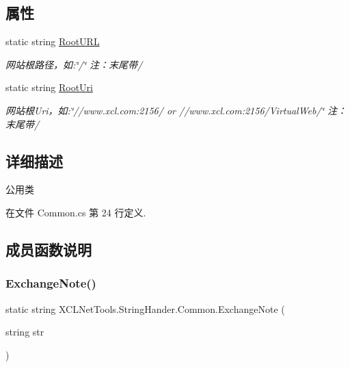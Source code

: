 \subsection*{属性}
\begin{DoxyCompactItemize}
\item 
static string \hyperlink{class_x_c_l_net_tools_1_1_string_hander_1_1_common_a87e9775b7bdaaf9bc205a148b1335ee2}{Root\+U\+RL}
\begin{DoxyCompactList}\small\item\em 网站根路径，如\+:\char`\"{}/\char`\"{} 注：末尾带\textquotesingle{}/\textquotesingle{} \end{DoxyCompactList}\item 
static string \hyperlink{class_x_c_l_net_tools_1_1_string_hander_1_1_common_ae924e6a3e073efd4a75d53ea7095f976}{Root\+Uri}
\begin{DoxyCompactList}\small\item\em 网站根\+Uri，如\+:\char`\"{}//www.\+xcl.\+com\+:2156/ or //www.\+xcl.\+com\+:2156/\+Virtual\+Web/\char`\"{} 注：末尾带\textquotesingle{}/\textquotesingle{} \end{DoxyCompactList}\end{DoxyCompactItemize}


\subsection{详细描述}
公用类 



在文件 Common.\+cs 第 24 行定义.



\subsection{成员函数说明}
\mbox{\label{class_x_c_l_net_tools_1_1_string_hander_1_1_common_af6ad14eae24704cda11cc498849d9737}} 
\subsubsection{\texorpdfstring{Exchange\+Note()}{ExchangeNote()}}
{\footnotesize\ttfamily static string X\+C\+L\+Net\+Tools.\+String\+Hander.\+Common.\+Exchange\+Note (\begin{DoxyParamCaption}\item[{string}]{str }\end{DoxyParamCaption})\hspace{0.3cm}{\ttfamily [static]}}




